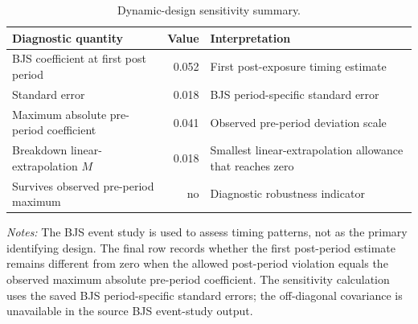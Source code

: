 \begin{table}[ht]
\centering
\caption{Dynamic-design sensitivity summary.}
\label{tab:dynamic_sensitivity_summary}
\begin{threeparttable}
\small
\setlength{\tabcolsep}{5pt}
\begin{tabular}{p{.42\linewidth}rp{.34\linewidth}}
\toprule
Diagnostic quantity & Value & Interpretation \\
\midrule
BJS coefficient at first post period & 0.052 & First post-exposure timing estimate \\
Standard error & 0.018 & BJS period-specific standard error \\
Maximum absolute pre-period coefficient & 0.041 & Observed pre-period deviation scale \\
Breakdown linear-extrapolation $M$ & 0.018 & Smallest linear-extrapolation allowance that reaches zero \\
Survives observed pre-period maximum & no & Diagnostic robustness indicator \\
\bottomrule
\end{tabular}
\begin{tablenotes}[flushleft]\footnotesize
\item \textit{Notes:} The BJS event study is used to assess timing patterns, not as the primary identifying design. The final row records whether the first post-period estimate remains different from zero when the allowed post-period violation equals the observed maximum absolute pre-period coefficient. The sensitivity calculation uses the saved BJS period-specific standard errors; the off-diagonal covariance is unavailable in the source BJS event-study output.
\end{tablenotes}
\end{threeparttable}
\end{table}
